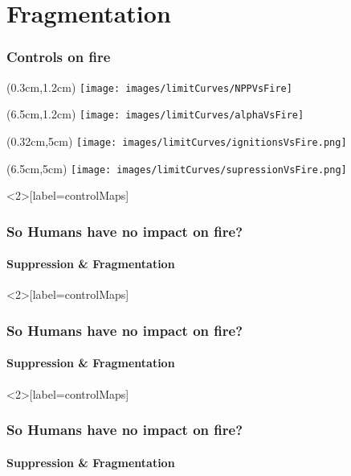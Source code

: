 \section{Fragmentation}



\begin{frame}
	\frametitle{Controls on fire}
	\begin{textblock*}{14cm}(0.3cm,1.2cm)
		\texttt{[image: images/limitCurves/NPPVsFire]}	
	\end{textblock*}
	\begin{textblock*}{14cm}(6.5cm,1.2cm)
		\texttt{[image: images/limitCurves/alphaVsFire]}	
	\end{textblock*}
	\begin{textblock*}{14cm}(0.32cm,5cm)
		\texttt{[image: images/limitCurves/ignitionsVsFire.png]}		
	\end{textblock*}
	\begin{textblock*}{14cm}(6.5cm,5cm)
		\texttt{[image: images/limitCurves/supressionVsFire.png]}		
	\end{textblock*}
\end{frame}

\begin{frame}<2>[label=controlMaps]
    \frametitle{So Humans have no impact on fire?}
    \framesubtitle{Suppression \& Fragmentation}
\end{frame}

\addtocounter{framenumber}{-1}
\begin{frame}<2>[label=controlMaps]
	\frametitle{So Humans have no impact on fire?}
	\framesubtitle{Suppression \& Fragmentation}
\end{frame}

\addtocounter{framenumber}{-1}
\begin{frame}<2>[label=controlMaps]
	\frametitle{So Humans have no impact on fire?}
	\framesubtitle{Suppression \& Fragmentation}
\end{frame}

